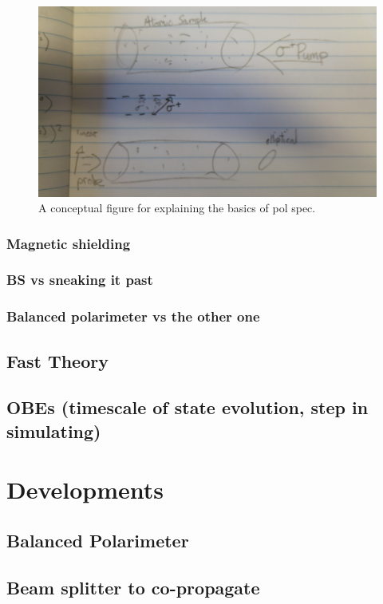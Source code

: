 \begin{figure}
\centering
\includegraphics[width=\linewidth,angle=180]{chapter1/Figs/pol_spec_explanation_placeholder.jpg}
\caption{A conceptual figure for explaining the basics of pol spec.}
\label{figure:pol_spec_explanation}
\end{figure}


\subsubsection{Magnetic shielding}
\subsubsection{BS vs sneaking it past}
\subsubsection{Balanced polarimeter vs the other one}

\subsection{Fast Theory}
\subsection{OBEs (timescale of state evolution, step in simulating)}
\section{Developments}
\subsection{Balanced Polarimeter}
\subsection{Beam splitter to co-propagate}
